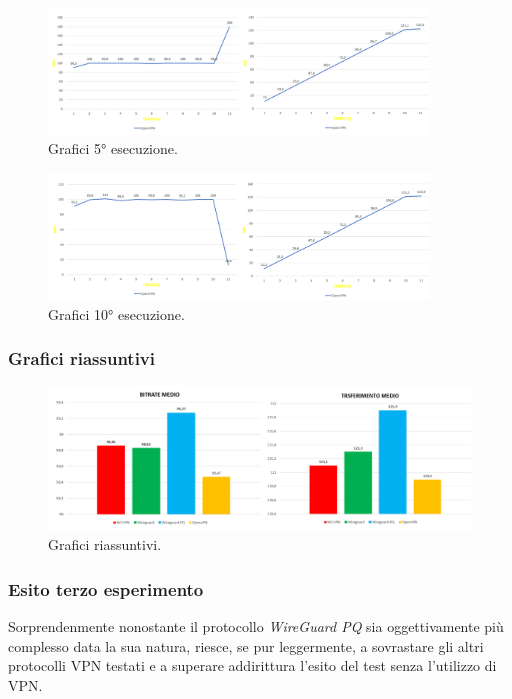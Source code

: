 \begin{figure}[h] \includegraphics[width=0.9\textwidth] {Tesi magistrale/capitoli/images/43.png}
\centering
\caption{Grafici 5° esecuzione.}
\end{figure}

\begin{figure}[h] \includegraphics[width=0.9\textwidth] {Tesi magistrale/capitoli/images/44.png}
\centering
\caption{Grafici 10° esecuzione.}
\end{figure}

\newpage
\subsubsection{Grafici riassuntivi}

\begin{figure}[h] \includegraphics[width=1\textwidth] {Tesi magistrale/capitoli/images/36.png}
\centering
\caption{Grafici riassuntivi.}
\end{figure}

\subsubsection{Esito terzo esperimento}
Sorprendenmente nonostante il protocollo \emph{WireGuard PQ} sia oggettivamente più complesso data la sua natura, riesce, se pur leggermente, a sovrastare gli altri protocolli VPN testati e a superare addirittura l'esito del test senza l'utilizzo di VPN. 

